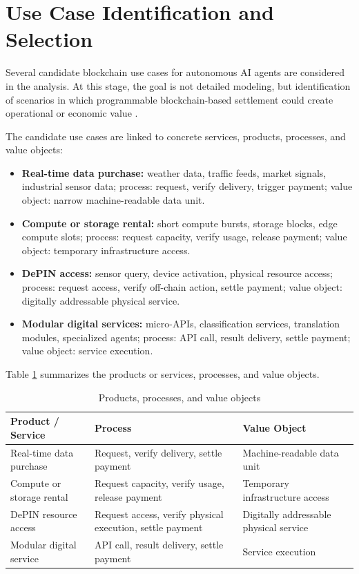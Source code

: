 \documentclass[12pt,a4paper,oneside]{article}
\theoremstyle{definition}
\theoremstyle{plain}
\begin{document}
\section{Use Case Identification and Selection}

Several candidate blockchain use cases for autonomous AI agents are considered in the analysis. At this stage, the goal is not detailed modeling, but identification of scenarios in which programmable blockchain-based settlement could create operational or economic value \citep{krueger2026workshop5}.

The candidate use cases are linked to concrete services, products, processes, and value objects:

\begin{itemize}[leftmargin=1.2cm]
\item \textbf{Real-time data purchase:} weather data, traffic feeds, market signals, industrial sensor data; process: request, verify delivery, trigger payment; value object: narrow machine-readable data unit.
\item \textbf{Compute or storage rental:} short compute bursts, storage blocks, edge compute slots; process: request capacity, verify usage, release payment; value object: temporary infrastructure access.
\item \textbf{DePIN access:} sensor query, device activation, physical resource access; process: request access, verify off-chain action, settle payment; value object: digitally addressable physical service.
\item \textbf{Modular digital services:} micro-APIs, classification services, translation modules, specialized agents; process: API call, result delivery, settle payment; value object: service execution.
\end{itemize}

Table \ref{tab:products_processes_values} summarizes the products or services, processes, and value objects.

\begin{table}[H]
\centering
\caption{Products, processes, and value objects}
\label{tab:products_processes_values}
\begin{tabular}{p{4.2cm}p{4.3cm}p{5.1cm}}
\toprule
\textbf{Product / Service} & \textbf{Process} & \textbf{Value Object} \\
\midrule
Real-time data purchase & Request, verify delivery, settle payment & Machine-readable data unit \\
Compute or storage rental & Request capacity, verify usage, release payment & Temporary infrastructure access \\
DePIN resource access & Request access, verify physical execution, settle payment & Digitally addressable physical service \\
Modular digital service & API call, result delivery, settle payment & Service execution \\
\bottomrule
\end{tabular}
\end{table}
\end{document}
